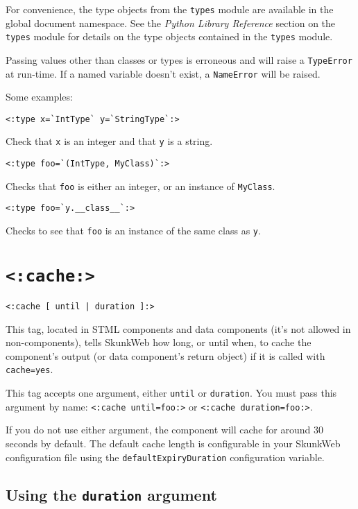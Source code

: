 \documentclass{manual}
\begin{document}
{{For convenience, the type objects from the \texttt{types} module
are available in the global document namespace.  See the \emph{Python
Library Reference} section on the \texttt{types} module for details
on the type objects contained in the \texttt{types} module.


Passing values other than classes or types is erroneous and will raise
a \texttt{TypeError} at run-time.  If a named variable doesn't exist, a
\texttt{NameError} will be raised.

Some examples:
\begin{verbatim}
<:type x=`IntType` y=`StringType`:>
\end{verbatim}  
Check that \texttt{x} is an integer and that \texttt{y} is a string.

\begin{verbatim}
<:type foo=`(IntType, MyClass)`:>
\end{verbatim}
Checks that \texttt{foo} is either an integer, or an instance of
\texttt{MyClass}.

\begin{verbatim}
<:type foo=`y.__class__`:>
\end{verbatim}
Checks to see that \texttt{foo} is an instance of the same class as
\texttt{y}.



\section{\texttt{<:cache:>}}
\label{tagcache}

\begin{verbatim}<:cache [ until | duration ]:>\end{verbatim}

This tag, located in STML components and data components
(it's not allowed in non-components), tells SkunkWeb how long,
or until when, to cache the component's output (or
data component's return object) if it is called with
\texttt{cache=yes}.

This tag accepts one argument, either \texttt{until}
or \texttt{duration}. You must pass this argument by name:
\texttt{<:cache until=foo:>} or
\texttt{<:cache duration=foo:>}.

If you do not use either argument, the component will cache for around
30 seconds by default. The default cache length is configurable in
your SkunkWeb configuration file using the
\texttt{defaultExpiryDuration} configuration variable.

\subsection{Using the \texttt{duration} argument}

}}
\end{document}
